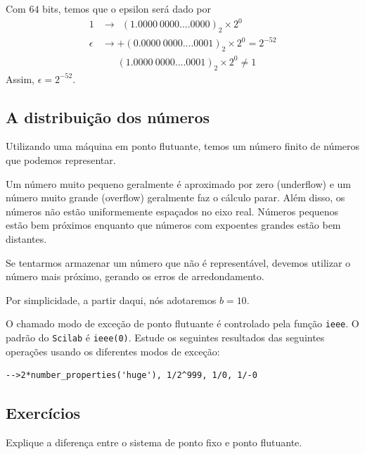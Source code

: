 \begin{ex}
  Com $64$ bits, temos que o epsilon será dado por
\begin{equation*}
  \begin{split}
  1      &\rightarrow ~~(1.0000~0000....0000)_2\times 2^{0} \\
\epsilon &\rightarrow  +(0.0000~0000....0001)_2\times 2^{0}  = 2^{-52} \\
         &      ~~~~~~~ (1.0000~0000....0001)_2\times 2^{0} \neq 1    
  \end{split}
\end{equation*}
Assim, $\epsilon = 2^{-52}$.
\end{ex}



\subsection{A distribuição dos números}
Utilizando uma máquina em ponto flutuante, temos um número finito de números que podemos representar.

Um número muito pequeno geralmente é aproximado por zero (underflow) e um número muito grande (overflow) geralmente faz o cálculo parar.
Além disso, os números não estão uniformemente espaçados no eixo real. Números pequenos estão bem próximos enquanto que números com expoentes grandes estão bem distantes.

Se tentarmos armazenar um número que não é representável, devemos utilizar o número mais próximo, gerando os erros de arredondamento.

Por simplicidade, a partir daqui, nós adotaremos $b=10$.

\ifisscilab
\begin{obs}
  O chamado modo de exceção de ponto flutuante é controlado pela função \verb+ieee+. O padrão do \verb+Scilab+ é \verb+ieee(0)+. Estude os seguintes resultados das seguintes operações usando os diferentes modos de exceção:
\begin{verbatim}
-->2*number_properties('huge'), 1/2^999, 1/0, 1/-0
\end{verbatim}
\end{obs}
\fi

\subsection*{Exercícios}

\begin{exer} Explique a diferença entre o sistema de ponto fixo e ponto flutuante.
\end{exer}

